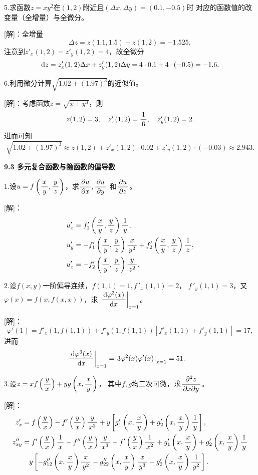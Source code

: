 \bs

5.求函数$z=xy^2$在$(1,2)$附近且$(\Delta x,\Delta y)=(0.1,-0.5)$时
对应的函数值的改变量（全增量）与全微分。

[解]：全增量
$$\Delta z=z(1.1,1.5)-z(1,2)=-1.525,$$
注意到$z'_x(1,2)=z'_y(1,2)=4$，故全微分
$$\d z=z'_x(1,2)\Delta x+z'_y(1,2)\Delta y
=4\cdot 0.1+4\cdot(-0.5)=-1.6.$$
\fin

\bs

6.利用微分计算$\sqrt{1.02+(1.97)^3}$的近似值。

[解]：考虑函数$z=\sqrt{x+y^3}$，则
$$z(1,2)=3,\quad z'_x(1,2)=\df16,\quad z'_y(1,2)=2.$$
进而可知
$$\sqrt{1.02+(1.97)^3}
\approx z(1,2)+z'_x(1,2)\cdot0.02+z'_y(1,2)\cdot(-0.03)
\approx 2.943.$$
\fin

\bs

\begin{center}
	\bf 9.3 多元复合函数与隐函数的偏导数
\end{center}

1.设$u=f\left(\df xy,\df yz\right)$，求$\df {\p u}{\p x},\df {\p u}{\p y}$
和$\df {\p u}{\p z}$。

[解]：
\begin{align*}
	u'_x&=f'_1\left(\df xy,\df yz\right)\df1y,\\
	u'_y&=-f'_1\left(\df xy,\df yz\right)\df x{y^2}
	+f'_2\left(\df xy,\df yz\right)\df1z,\\
	u'_x&=-f'_2\left(\df xy,\df yz\right)\df{y}{z^2}.
\end{align*}
\fin

\bs

2.设$f(x,y)$一阶偏导连续，$f(1,1)=1,f\,'_x(1,1)=2$，
$f\,'_y(1,1)=3$，又$\varphi(x)=f(x,f(x,x))$，求
$\left.\df{\d\varphi^3(x)}{\d x}\right|_{x=1}$。

[解]：
$$\varphi'(1)=f'_x(1,f(1,1))+f'_y(1,f(1,1))[f'_x(1,1)+f'_y(1,1)]
=17,$$
进而
\begin{align*}
	\left.\df{\d\varphi^3(x)}{\d x}\right|_{x=1}
	&=\left.3\varphi^2(x)\varphi'(x)\right|_{x=1}=51.
\end{align*}
\fin

\bs

3.设$z=xf\left(\df yx\right)+yg\left(x,\df xy\right)$，
其中$f,g$均二次可微，求$\df{\p^2 z}{\p x\p y}$。

[解]：
\begin{align*}
	z'_x&=f\left(\df yx\right)-f'\left(\df yx\right)\df{y}{x^2}
	+y\left[g'_1\left(x,\df xy\right)+g'_2\left(x,\df xy\right)\df1y\right],\\
	z''_{xy}&=f'\left(\df yx\right)\df1x
	-f''\left(\df yx\right)\df{y}{x^3}-f'\left(\df yx\right)\df1{x^2}
	+g'_1\left(x,\df xy\right)+g'_2\left(x,\df xy\right)\df1y\\
	&\quad
	y\left[-g''_{12}\left(x,\df xy\right)\df{x}{y^2}-g''_{22}\left(x,\df
	xy\right)\df{x}{y^3}-g'_2\left(x,\df xy\right)\df1{y^2}\right].
\end{align*}
\fin

